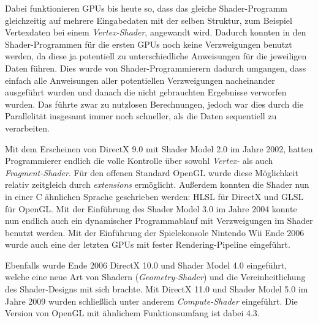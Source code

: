 \documentclass[oneside]{ausarbeitung}
\newcommand*{\quotize}[1]{\glqq #1\grqq}
\begin{document}
Dabei funktionieren \ac{GPU}s bis heute so, dass das gleiche Shader-Programm gleichzeitig auf mehrere Eingabedaten mit der selben Struktur, zum Beispiel Vertexdaten bei einem \textit{Vertex-Shader}, angewandt wird. Dadurch konnten in den Shader-Programmen für die ersten \ac{GPU}s noch keine Verzweigungen benutzt werden, da diese ja potentiell zu unterschiedliche Anweisungen für die jeweiligen Daten führen. Dies wurde von Shader-Programmierern dadurch umgangen, dass einfach alle Anweisungen aller potentiellen Verzweigungen nacheinander ausgeführt wurden und danach die nicht gebrauchten Ergebnisse verworfen wurden. Das führte zwar zu \quotize{nutzlosen} Berechnungen, jedoch war dies durch die Parallelität insgesamt immer noch schneller, als die Daten sequentiell zu verarbeiten.

Mit dem Erscheinen von DirectX 9.0 mit Shader Model 2.0 im Jahre 2002, hatten Programmierer endlich die volle Kontrolle über sowohl \textit{Vertex-} als auch \textit{Fragment-Shader}. Für den offenen Standard OpenGL wurde diese Möglichkeit relativ zeitgleich durch \textit{extensions} ermöglicht. Außerdem konnten die Shader nun in einer C ähnlichen Sprache geschrieben werden: \ac{HLSL} \cite{wikipedia:hlsl} für DirectX und \ac{GLSL} \cite{wikipedia:hlsl} für OpenGL. Mit der Einführung des Shader Model 3.0 im Jahre 2004 konnte nun endlich auch ein dynamischer Programmablauf mit Verzweigungen im Shader benutzt werden. Mit der Einführung der Spielekonsole Nintendo Wii Ende 2006 wurde auch eine der letzten \ac{GPU}s mit fester Rendering-Pipeline eingeführt. 

Ebenfalls wurde Ende 2006 DirectX 10.0 und Shader Model 4.0 eingeführt, welche eine neue Art von Shadern (\textit{Geometry-Shader}) und die Vereinheitlichung des Shader-Designs mit sich brachte. Mit DirectX 11.0 und Shader Model 5.0 im Jahre 2009 wurden schließlich unter anderem \textit{Compute-Shader} eingeführt. Die Version von OpenGL mit ähnlichem Funktionsumfang ist dabei 4.3.
\end{document}
